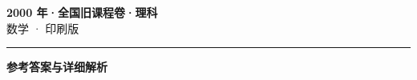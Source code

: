 \documentclass[zihao=5, a4paper]{ctexart}
\begin{document}
\begin{center}
  {\Large\bfseries 2000 年·全国旧课程卷·理科}\\[4pt]
  {\large 数学 · 印刷版}
\end{center}
\medskip
{}

\par\bigskip\hrule\bigskip
{}
\begin{center}{\large\bfseries 参考答案与详细解析}\end{center}
\smallskip

\end{document}
